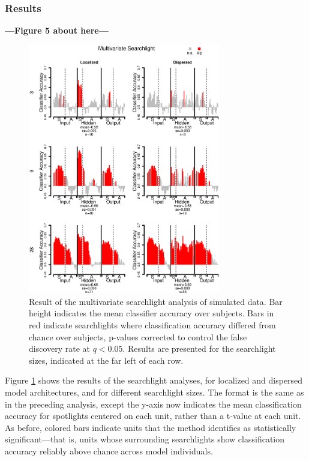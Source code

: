 \subsubsection{Results} 
\textbf{---Figure 5 about here---}
\begin{figure}
\centering
\includegraphics[width=0.75\textwidth]{figures/searchlight.eps}
\caption{\label{fig.searchlight} Result of the multivariate searchlight analysis of simulated data. Bar height indicates the mean classifier accuracy over subjects. Bars in red indicate searchlights where classification accuracy differed from chance over subjects, p-values corrected to control the false discovery rate at $q<0.05$. Results are presented for the searchlight sizes, indicated at the far left of each row.}
\end{figure}

Figure \ref{fig.searchlight} shows the results of the searchlight analyses, for localized and dispersed model architectures, and for different searchlight sizes. The format is the same as in the preceding analysis, except the y-axis now indicates the mean classification accuracy for spotlights centered on each unit, rather than a t-value at each unit. As before, colored bars indicate units that the method identifies as statistically significant---that is, units whose surrounding searchlights show classification accuracy reliably above chance across model individuals.

